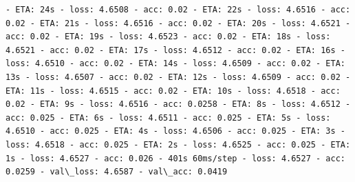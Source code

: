 \documentclass[11pt]{article}
\begin{document}
\begin{Verbatim}[commandchars=\\\{\}]
- ETA: 24s - loss: 4.6508 - acc: 0.02 - ETA: 22s - loss: 4.6516 - acc: 0.02 - ETA: 21s - loss: 4.6516 - acc: 0.02 - ETA: 20s - loss: 4.6521 - acc: 0.02 - ETA: 19s - loss: 4.6523 - acc: 0.02 - ETA: 18s - loss: 4.6521 - acc: 0.02 - ETA: 17s - loss: 4.6512 - acc: 0.02 - ETA: 16s - loss: 4.6510 - acc: 0.02 - ETA: 14s - loss: 4.6509 - acc: 0.02 - ETA: 13s - loss: 4.6507 - acc: 0.02 - ETA: 12s - loss: 4.6509 - acc: 0.02 - ETA: 11s - loss: 4.6515 - acc: 0.02 - ETA: 10s - loss: 4.6518 - acc: 0.02 - ETA: 9s - loss: 4.6516 - acc: 0.0258 - ETA: 8s - loss: 4.6512 - acc: 0.025 - ETA: 6s - loss: 4.6511 - acc: 0.025 - ETA: 5s - loss: 4.6510 - acc: 0.025 - ETA: 4s - loss: 4.6506 - acc: 0.025 - ETA: 3s - loss: 4.6518 - acc: 0.025 - ETA: 2s - loss: 4.6525 - acc: 0.025 - ETA: 1s - loss: 4.6527 - acc: 0.026 - 401s 60ms/step - loss: 4.6527 - acc: 0.0259 - val\_loss: 4.6587 - val\_acc: 0.0419


\end{Verbatim}
\end{document}
